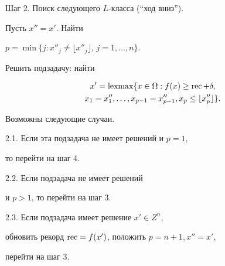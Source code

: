 \noindent{}Шаг 2. Поиск следующего $L$-класса (``ход вниз'').





\hspace{10mm}  Пусть $x'' = x'.$ Найти


$ p=\min\{j : x''_j \neq \lfloor x''_j \rfloor$,  $j=1,\dotsc,n\}.$





\hspace{10mm} Решить подзадачу: найти


\begin{gather*}


x' = \lexmax \{ x \in \Omega : f(x) \geq \rec + \delta,


\\ x_1 =x''_1,\dotsc,x_{p-1}= x''_{p-1},  x_p \leq \lfloor


x''_p\rfloor\}.


\end{gather*}





\hspace{10mm} Возможны следующие случаи.





\hspace{10mm} 2.1. Если эта подзадача не имеет решений и $p = 1$,




то  перейти на шаг 4.





\hspace{10mm} 2.2. Если подзадача не имеет решений


и $p>1$, то перейти на шаг 3.





\hspace{10mm} 2.3. Если подзадача имеет решение $x' \in  Z^n$, 





\hspace{17mm}  обновить рекорд $\operatorname{rec} = f(x')$, положить $p = n+1, x''= x'$,





\hspace{17mm} перейти на шаг 3.





